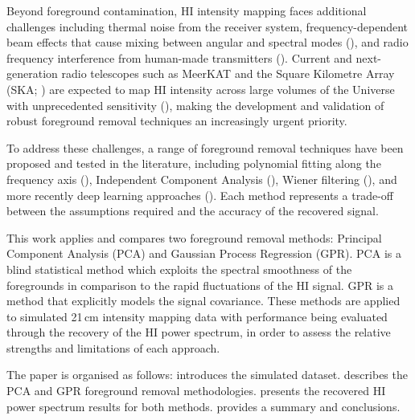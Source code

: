 Beyond foreground contamination, HI intensity mapping faces additional challenges including thermal noise from the receiver system, frequency-dependent beam effects that cause mixing between angular and spectral modes (\cite{cunningtonImpactForegroundsIntensity2019}), and radio frequency interference from human-made transmitters (\cite{harperInterferenceGlobalNavigation2018}). Current and next-generation radio telescopes such as MeerKAT and the Square Kilometre Array (SKA; \cite{groupCosmologyPhase12020}) are expected to map HI intensity across large volumes of the Universe with unprecedented sensitivity (\cite{hothiComparingForegroundRemoval2021}), making the development and validation of robust foreground removal techniques an increasingly urgent priority.

To address these challenges, a range of foreground removal techniques have been proposed and tested in the literature, including polynomial fitting along the frequency axis (\cite{gkogkouForegroundRemovalHI2026}), Independent Component Analysis (\cite{hothiComparingForegroundRemoval2021}), Wiener filtering (\cite{tegmarkHowMakeMaps1997}), and more recently deep learning approaches (\cite{makinenDeep21DeepLearning2021}). Each method represents a trade-off between the assumptions required and the accuracy of the recovered signal.

This work applies and compares two foreground removal methods: Principal Component Analysis (PCA) and Gaussian Process Regression (GPR). PCA is a blind statistical method which exploits the spectral smoothness of the foregrounds in comparison to the rapid fluctuations of the HI signal. GPR is a method that explicitly models the signal covariance. These methods are applied to simulated 21\,cm intensity mapping data with performance being evaluated through the recovery of the HI power spectrum, in order to assess the relative strengths and limitations of each approach.

The paper is organised as follows:  introduces the simulated dataset.  describes the PCA and GPR foreground removal methodologies.  presents the recovered HI power spectrum results for both methods.  provides a summary and conclusions.

